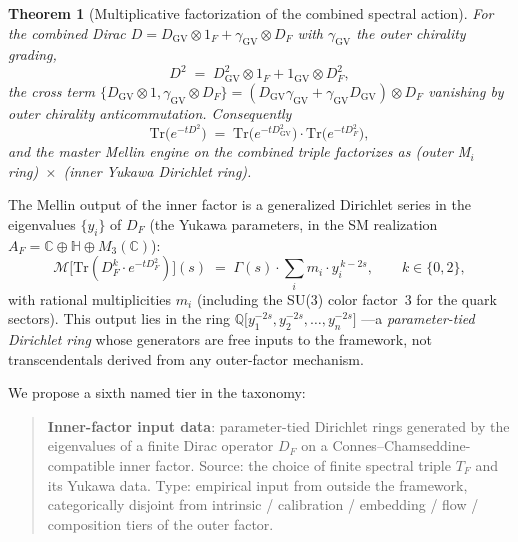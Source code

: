 \documentclass[aps,pra,twocolumn,superscriptaddress,longbibliography]{revtex4-2}
\newtheorem{theorem}{Theorem}
\begin{document}
\begin{theorem}[Multiplicative factorization of the combined
spectral action]
\label{thm:ac_factorization}
For the combined Dirac $D = D_{\mathrm{GV}} \otimes 1_F + \gamma_{\mathrm{GV}}
\otimes D_F$ with $\gamma_{\mathrm{GV}}$ the outer chirality
grading,
\begin{equation}\label{eq:d_squared_factorize}
  D^2 \;=\; D_{\mathrm{GV}}^2 \otimes 1_F + 1_{\mathrm{GV}}
            \otimes D_F^2,
\end{equation}
the cross term $\{D_{\mathrm{GV}} \otimes 1, \gamma_{\mathrm{GV}}
\otimes D_F\} = (D_{\mathrm{GV}}\gamma_{\mathrm{GV}} +
\gamma_{\mathrm{GV}}D_{\mathrm{GV}}) \otimes D_F$ vanishing by
outer chirality anticommutation.  Consequently
\begin{equation}\label{eq:trace_factorize}
  \mathrm{Tr}\bigl(e^{-tD^2}\bigr)
  \;=\; \mathrm{Tr}\bigl(e^{-tD_{\mathrm{GV}}^2}\bigr)
        \cdot \mathrm{Tr}\bigl(e^{-tD_F^2}\bigr),
\end{equation}
and the master Mellin engine on the combined triple factorizes as
(outer M$_i$ ring)~$\times$~(inner Yukawa Dirichlet ring).
\end{theorem}

The Mellin output of the inner factor is a generalized Dirichlet
series in the eigenvalues $\{y_i\}$ of $D_F$ (the Yukawa parameters,
in the SM realization $A_F = \mathbb{C} \oplus \mathbb{H} \oplus
M_3(\mathbb{C})$):
\begin{equation}\label{eq:inner_dirichlet}
  \mathcal{M}\bigl[\mathrm{Tr}(D_F^k \cdot e^{-t D_F^2})\bigr](s)
  \;=\; \Gamma(s) \cdot \sum_i m_i \cdot y_i^{\,k - 2s},
  \qquad k \in \{0, 2\},
\end{equation}
with rational multiplicities $m_i$ (including the SU(3) color
factor~3 for the quark sectors).  This output lies in the ring
$\mathbb{Q}\bigl[y_1^{-2s}, y_2^{-2s}, \ldots, y_n^{-2s}\bigr]$
---a \emph{parameter-tied Dirichlet ring} whose generators are
free inputs to the framework, not transcendentals derived from any
outer-factor mechanism.

We propose a sixth named tier in the taxonomy:

\begin{quote}
\textbf{Inner-factor input data}: parameter-tied Dirichlet rings
generated by the eigenvalues of a finite Dirac operator $D_F$ on
a Connes--Chamseddine-compatible inner factor.  Source: the choice
of finite spectral triple $T_F$ and its Yukawa data.  Type:
empirical input from outside the framework, categorically disjoint
from intrinsic / calibration / embedding / flow / composition tiers
of the outer factor.
\end{quote}
\end{document}
